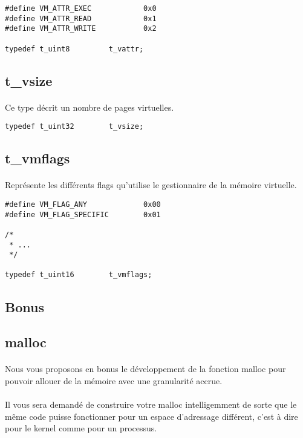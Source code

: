 \documentclass[10pt,a4wide]{article}
\begin{document}
\begin{verbatim}
#define VM_ATTR_EXEC            0x0
#define VM_ATTR_READ            0x1
#define VM_ATTR_WRITE           0x2

typedef t_uint8         t_vattr;
\end{verbatim}

\subsection{t\_vsize}

\paragraph{}

Ce type d\'ecrit un nombre de pages virtuelles.

\begin{verbatim}
typedef t_uint32        t_vsize;
\end{verbatim}

\subsection{t\_vmflags}

\paragraph{}

Repr\'esente les diff\'erents flags qu'utilise le gestionnaire de la m\'emoire
virtuelle.

\begin{verbatim}
#define VM_FLAG_ANY             0x00
#define VM_FLAG_SPECIFIC        0x01

/*
 * ...
 */

typedef t_uint16        t_vmflags;
\end{verbatim}

\subsection{Bonus}

\subsection{malloc}

\paragraph{}

Nous vous proposons en bonus le d\'eveloppement de la fonction malloc
pour pouvoir allouer de la m\'emoire avec une granularit\'e accrue.

\paragraph{}

Il vous sera demand\'e de construire votre malloc intelligemment de sorte
que le m\^eme code puisse fonctionner pour un espace d'adressage diff\'erent,
c'est \`a dire pour le kernel comme pour un processus.
\end{document}
